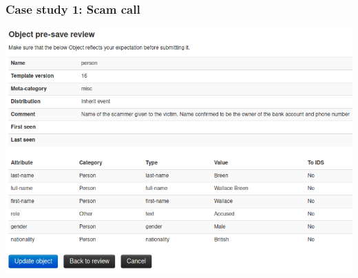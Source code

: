 \begin{frame}
    \frametitle{Case study 1: Scam call}
    \begin{center}
        \includegraphics[width=1.0\linewidth]{pictures/case1/object-person.png}
    \end{center}
\end{frame}

